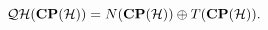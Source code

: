 \begin{equation}
{\cal QH}({\bf CP}({\cal H})) = N({\bf CP}({\cal H})) \oplus T({\bf CP}({\cal H})).
\label{quhache}
\end{equation}

